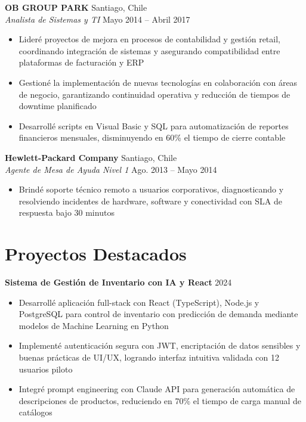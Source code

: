 \documentclass[11pt,letterpaper]{article}
\begin{document}
\vspace{2pt}
\textbf{OB GROUP PARK} \hfill Santiago, Chile\\
\textit{Analista de Sistemas y TI} \hfill Mayo 2014 – Abril 2017
\begin{itemize}
  \item Lideré proyectos de mejora en procesos de contabilidad y gestión retail, coordinando integración de sistemas y asegurando compatibilidad entre plataformas de facturación y ERP
  \item Gestioné la implementación de nuevas tecnologías en colaboración con áreas de negocio, garantizando continuidad operativa y reducción de tiempos de downtime planificado
  \item Desarrollé scripts en Visual Basic y SQL para automatización de reportes financieros mensuales, disminuyendo en 60\% el tiempo de cierre contable
\end{itemize}
\vspace{2pt}
\textbf{Hewlett-Packard Company} \hfill Santiago, Chile\\
\textit{Agente de Mesa de Ayuda Nivel 1} \hfill Ago. 2013 – Mayo 2014
\begin{itemize}
  \item Brindé soporte técnico remoto a usuarios corporativos, diagnosticando y resolviendo incidentes de hardware, software y conectividad con SLA de respuesta bajo 30 minutos
\end{itemize}

\section{Proyectos Destacados}

\textbf{Sistema de Gestión de Inventario con IA y React} \hfill 2024
\begin{itemize}
  \item Desarrollé aplicación full-stack con React (TypeScript), Node.js y PostgreSQL para control de inventario con predicción de demanda mediante modelos de Machine Learning en Python
  \item Implementé autenticación segura con JWT, encriptación de datos sensibles y buenas prácticas de UI/UX, logrando interfaz intuitiva validada con 12 usuarios piloto
  \item Integré prompt engineering con Claude API para generación automática de descripciones de productos, reduciendo en 70\% el tiempo de carga manual de catálogos
\end{itemize}
\end{document}
